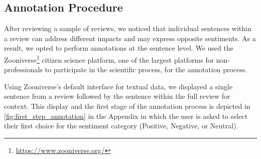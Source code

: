 \subsection{Annotation Procedure}
After reviewing a sample of reviews, we noticed that individual sentences within a review can address different impacts and may express opposite sentiments. As a result, we opted to perform annotations at the sentence level. We used the Zooniverse\footnote{\url{https://www.zooniverse.org/}} citizen science platform, one of the largest platforms for non-professionals to participate in the scientific process, for the annotation process. 

Using Zooniverse's default interface for textual data, we displayed a single sentence from a review followed by the sentence within the full review for context.
This display and the first stage of the annotation process is depicted in \autoref{fig:first_step_annotation} in the Appendix in which the user is asked to select their first choice for the sentiment category (Positive, Negative, or Neutral).


